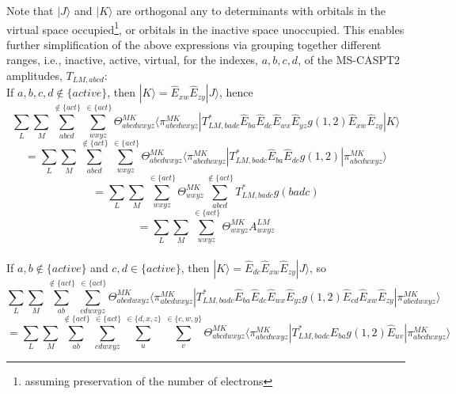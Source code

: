 \documentclass[12pt]{article}
\begin{document}
Note that $|J\rangle$ and $|K\rangle$ are orthogonal
any to determinants with orbitals in the virtual space occupied\footnote{assuming preservation of the number of electrons},
or orbitals in the inactive space unoccupied. This enables further simplification of the above expressions via grouping together
different ranges, i.e., inactive, active, virtual, for the indexes, $a,b,c,d$, of the MS-CASPT2 amplitudes, $T_{LM,abcd}$:\\

\noindent If $a,b,c,d \notin \{active\} $, then $|K\rangle = \hat{E}_{xw}\hat{E}_{zy}|J\rangle$, hence 
\begin{equation*}
\sum_{L} \sum_{M} \sum_{abcd}^{\notin \{act\} } \sum_{wxyz}^{\in\{act\}} \Theta^{MK}_{abcdwxyz} \langle \pi^{MK}_{abcdwxyz} |T^{*}_{LM,badc}\hat{E}_{ba}\hat{E}_{dc}\hat{E}_{wx}\hat{E}_{yz}g(1,2)
\hat{E}_{xw}\hat{E}_{zy}|K\rangle
\end{equation*}
\begin{equation*}
=\sum_{L} \sum_{M} \sum_{abcd}^{\notin \{act\} } \sum_{wxyz}^{\in\{act\}} \Theta^{MK}_{abcdwxyz} \langle \pi^{MK}_{abcdwxyz}|T^{*}_{LM,badc}\hat{E}_{ba}\hat{E}_{dc}g(1,2)|\pi^{MK}_{abcdwxyz} \rangle
\end{equation*}
\begin{equation*}
=\sum_{L} \sum_{M}  \sum_{wxyz}^{\in\{act\}} \Theta^{MK}_{wxyz} \sum_{abcd}^{\notin \{act\} }T^{*}_{LM,badc}g(badc)
\end{equation*}
\begin{equation*}
=\sum_{L} \sum_{M}  \sum_{wxyz}^{\in\{act\}} \Theta^{MK}_{wxyz}A^{LM}_{wxyz}
\end{equation*}
\\
\noindent If $a,b \notin \{active\} $ and $c,d \in \{active\}$, then $|K\rangle = \hat{E}_{dc}\hat{E}_{xw}\hat{E}_{zy}|J\rangle$,  so 
\begin{equation*}
\sum_{L} \sum_{M} \sum_{ab}^{\notin \{act\} } \sum_{cdwxyz}^{\in\{act\}} 
\Theta^{MK}_{abcdwxyz} \langle \pi^{MK}_{abcdwxyz}|T^{*}_{LM,badc}\hat{E}_{ba}\hat{E}_{dc}\hat{E}_{wx}\hat{E}_{yz}g(1,2)\hat{E}_{cd}\hat{E}_{xw}\hat{E}_{zy} |\pi^{MK}_{abcdwxyz}  \rangle
\end{equation*}
\begin{equation*}
=\sum_{L} \sum_{M} \sum_{ab}^{\notin \{act\} } \sum_{cdwxyz}^{\in\{act\}} \sum_{u}^{\in\{d,x,z\}}\sum_{v}^{\in\{c,w,y\}}
\Theta^{MK}_{abcdwxyz} \langle \pi^{MK}_{abcdwxyz}|T^{*}_{LM,badc}\hat{E}_{ba}g(1,2)\hat{E}_{uv} |\pi^{MK}_{abcdwxyz}  \rangle
\end{equation*}
\end{document}
